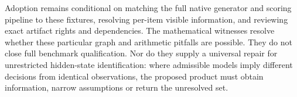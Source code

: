 Adoption remains conditional on matching the full native generator and scoring pipeline to these fixtures, resolving per-item visible information, and reviewing exact artifact rights and dependencies. The mathematical witnesses resolve whether these particular graph and arithmetic pitfalls are possible. They do not close full benchmark qualification. Nor do they supply a universal repair for unrestricted hidden-state identification: where admissible models imply different decisions from identical observations, the proposed product must obtain information, narrow assumptions or return the unresolved set.~\citep{exec25_bor_reference}
